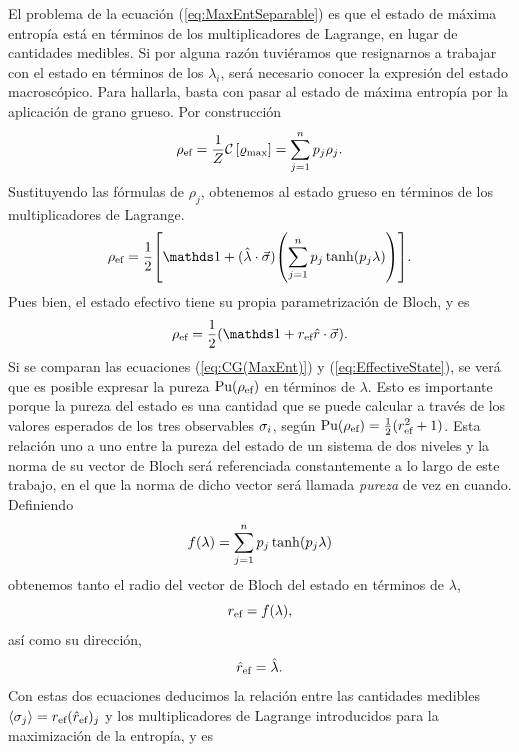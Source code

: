 El problema de la ecuación (\ref{eq:MaxEntSeparable}) es que el estado de máxima entropía está en términos de los multiplicadores de Lagrange, en lugar de cantidades medibles. Si por alguna razón tuviéramos que resignarnos a trabajar con el estado en términos de los $\lambda_{i}$, será necesario conocer la expresión del estado macroscópico. Para hallarla, basta con pasar al estado de máxima entropía por la aplicación de grano grueso. Por construcción 
\begin{equation}
    \rho_{\text{ef}}=\frac{1}{Z}\mathcal{C}\left[\varrho_{\max}\right]=\sum_{j=1}^{n}p_{j}\rho_{j}.\nonumber
\end{equation}
Sustituyendo las fórmulas de $\rho_{j}$, obtenemos al estado grueso en términos de los multiplicadores de Lagrange.
\begin{equation}\label{eq:CG(MaxEnt)}
    \rho_{\ef}=\frac{1}{2}\qty[\Id+(\paulivec{\lambda})\qty(\sum_{j=1}^{n}p_{j}\tanh(p_{j}\lambda))].
\end{equation}
Pues bien, el estado efectivo tiene su propia parametrización de Bloch, y es
\begin{equation}\label{eq:EffectiveState}
    \rho_{\ef}=\frac{1}{2}(\Id+r_{\ef}\paulivec{r}).
\end{equation}
Si se comparan las ecuaciones (\ref*{eq:CG(MaxEnt)}) y (\ref*{eq:EffectiveState}), se verá que es posible expresar la pureza $\text{Pu}(\rho_{\text{ef}})$ en términos de $\lambda$. Esto es importante porque la pureza del estado es una cantidad que se puede calcular a través de los valores esperados de los tres observables $\sigma_{i}$, según $\text{Pu}(\rho_{\text{ef}})=\frac{1}{2}(r_{\text{ef}}^{2}+1)$. Esta relación uno a uno entre la pureza del estado de un sistema de dos niveles y la norma de su vector de Bloch será referenciada constantemente a lo largo de este trabajo, en el que la norma de dicho vector será llamada \textit{pureza} de vez en cuando. Definiendo
\begin{equation}\label{eq:r(lambda)}
    f(\lambda)=\sum_{j=1}^{n}p_{j}\tanh(p_{j}\lambda)
\end{equation}
obtenemos tanto el radio del vector de Bloch del estado en términos de $\lambda$,
\begin{equation}
    r_{\text{ef}}=f(\lambda),\nonumber
\end{equation}
así como su dirección,
\begin{equation}
    \hat{r}_{\text{ef}}=\hat{\lambda}.\nonumber
\end{equation}
Con estas dos ecuaciones deducimos la relación entre las cantidades medibles $\expval{\sigma_{j}}=r_{\text{ef}}(\hat{r}_{\text{ef}})_{j}$ y los multiplicadores de Lagrange introducidos para la maximización de la entropía, y es

